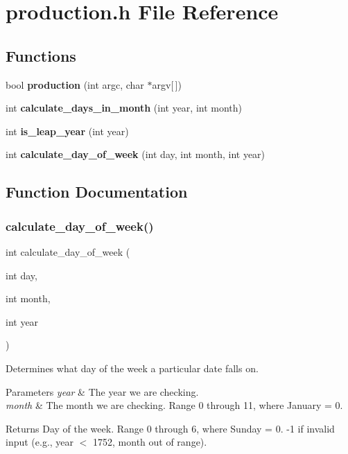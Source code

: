 \section{production.\+h File Reference}
\label{production_8h}
\subsection*{Functions}
\begin{DoxyCompactItemize}
\item 
bool \textbf{ production} (int argc, char $\ast$argv[$\,$])
\item 
int \textbf{ calculate\+\_\+days\+\_\+in\+\_\+month} (int year, int month)
\item 
int \textbf{ is\+\_\+leap\+\_\+year} (int year)
\item 
int \textbf{ calculate\+\_\+day\+\_\+of\+\_\+week} (int day, int month, int year)
\end{DoxyCompactItemize}


\subsection{Function Documentation}
\mbox{\label{production_8h_a366627f8be4bdb2683a04ca7254d9a2c}} 
\subsubsection{calculate\+\_\+day\+\_\+of\+\_\+week()}
{\footnotesize\ttfamily int calculate\+\_\+day\+\_\+of\+\_\+week (\begin{DoxyParamCaption}\item[{int}]{day,  }\item[{int}]{month,  }\item[{int}]{year }\end{DoxyParamCaption})}

Determines what day of the week a particular date falls on. 
\begin{DoxyParams}{Parameters}
{\em year} & The year we are checking. \\
\hline
{\em month} & The month we are checking. Range 0 through 11, where January = 0. \\
\hline
\end{DoxyParams}
\begin{DoxyReturn}{Returns}
Day of the week. Range 0 through 6, where Sunday = 0. -\/1 if invalid input (e.\+g., year $<$ 1752, month out of range). 
\end{DoxyReturn}


